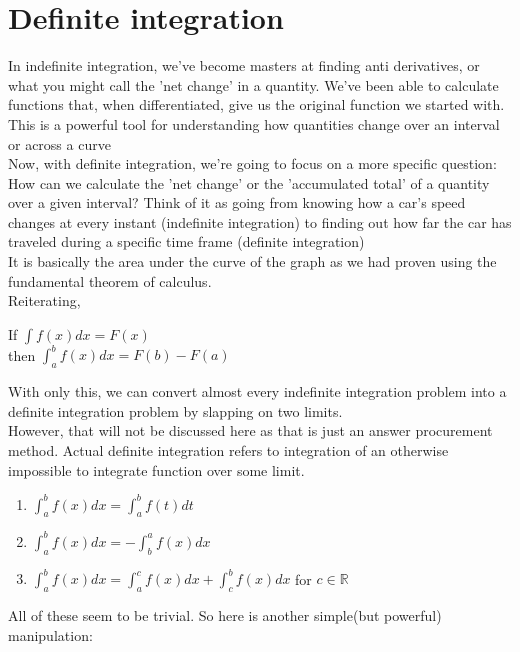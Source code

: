 \section{Definite integration}
In indefinite integration, we've become masters at finding anti derivatives, or what you might call the 'net change' in a quantity. We've been able to calculate functions that, when differentiated, give us the original function we started with. This is a powerful tool for understanding how quantities change over an interval or across a curve\\
Now, with definite integration, we're going to focus on a more specific question: How can we calculate the 'net change' or the 'accumulated total' of a quantity over a given interval? Think of it as going from knowing how a car's speed changes at every instant (indefinite integration) to finding out how far the car has traveled during a specific time frame (definite integration)\\
It is basically the area under the curve of the graph as we had proven using the fundamental theorem of calculus.\\
Reiterating,\\
\begin{theorem}
    If $\int f(x)dx= F(x)$\\
    then $\int^b_a f(x)dx= F(b)-F(a)$
\end{theorem}
With only this, we can convert almost every indefinite integration problem into a definite integration problem by slapping on two limits.\\
However, that will not be discussed here as that is just an answer procurement method. Actual definite integration refers to integration of an otherwise impossible to integrate function over some limit.\\
\begin{theorem}
    \begin{enumerate}
        \item $\int^b_af(x)dx=\int^b_af(t)dt$\\
        \item $\int^b_af(x)dx=-\int^a_bf(x)dx$\\
        \item $\int^b_af(x)dx=\int^c_af(x)dx+\int^b_cf(x)dx$ for $c \in \mathbb{R}$\\
    \end{enumerate}
\end{theorem}
All of these seem to be trivial. So here is another simple(but powerful) manipulation:\\
